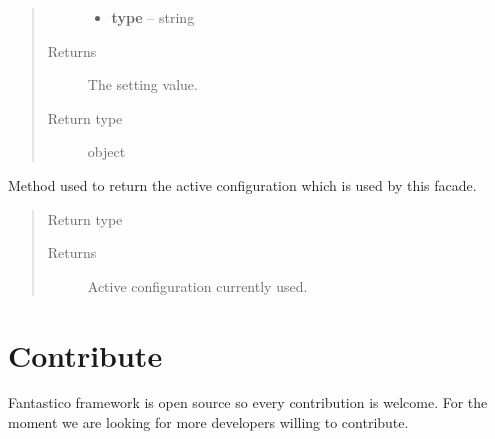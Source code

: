 \documentclass[letterpaper,10pt,english]{sphinxmanual}
\begin{document}
\begin{fulllineitems}
\begin{fulllineitems}
\begin{quote}
\begin{description}
\begin{itemize}
\item {} 
\textbf{type} -- string

\end{itemize}

\item[{Returns}] \leavevmode
The setting value.

\item[{Return type}] \leavevmode
object

\end{description}\end{quote}

\end{fulllineitems}


\begin{fulllineitems}
\label{get_started/settings:fantastico.settings.SettingsFacade.get_config}
Method used to return the active configuration which is used by this facade.
\begin{quote}\begin{description}
\item[{Return type}] \leavevmode
{\hyperref[get_started/settings:fantastico.settings.BasicSettings]{}}

\item[{Returns}] \leavevmode
Active configuration currently used.

\end{description}\end{quote}

\end{fulllineitems}


\end{fulllineitems}



\section{Contribute}
\label{get_started/contribute:contribute}\label{get_started/contribute::doc}
Fantastico framework is open source so every contribution is welcome. For the moment we are looking for more developers willing to
contribute.
\end{document}

